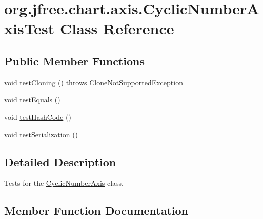 \hypertarget{classorg_1_1jfree_1_1chart_1_1axis_1_1_cyclic_number_axis_test}{}\section{org.\+jfree.\+chart.\+axis.\+Cyclic\+Number\+Axis\+Test Class Reference}
\label{classorg_1_1jfree_1_1chart_1_1axis_1_1_cyclic_number_axis_test}
\subsection*{Public Member Functions}
\begin{DoxyCompactItemize}
\item 
void \mbox{\hyperlink{classorg_1_1jfree_1_1chart_1_1axis_1_1_cyclic_number_axis_test_acfd68b1a38be39a61639ffd0ae698e64}{test\+Cloning}} ()  throws Clone\+Not\+Supported\+Exception 
\item 
void \mbox{\hyperlink{classorg_1_1jfree_1_1chart_1_1axis_1_1_cyclic_number_axis_test_aa37ad3a4901374781745df36644100ea}{test\+Equals}} ()
\item 
void \mbox{\hyperlink{classorg_1_1jfree_1_1chart_1_1axis_1_1_cyclic_number_axis_test_ae2b16ad6b4dfa1aac75f4aa04ebbcfdb}{test\+Hash\+Code}} ()
\item 
void \mbox{\hyperlink{classorg_1_1jfree_1_1chart_1_1axis_1_1_cyclic_number_axis_test_ad94267b403194f1d0788bd208a051918}{test\+Serialization}} ()
\end{DoxyCompactItemize}


\subsection{Detailed Description}
Tests for the \mbox{\hyperlink{classorg_1_1jfree_1_1chart_1_1axis_1_1_cyclic_number_axis}{Cyclic\+Number\+Axis}} class. 

\subsection{Member Function Documentation}
\mbox{\label{classorg_1_1jfree_1_1chart_1_1axis_1_1_cyclic_number_axis_test_acfd68b1a38be39a61639ffd0ae698e64}} 
